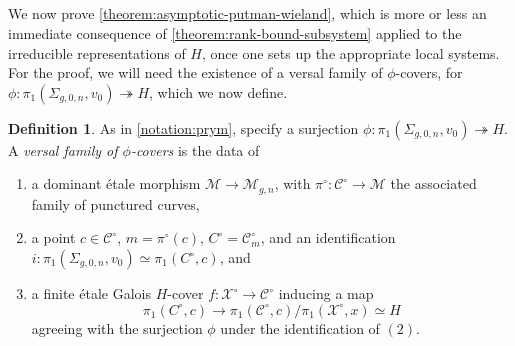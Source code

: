 \documentclass[12 pt]{amsart}
\theoremstyle{plain}
\theoremstyle{definition}
\newtheorem{definition}[subsubsection]{Definition}
\theoremstyle{remark}
\numberwithin{equation}{section}
\begin{document}
\subsection{}
	\label{subsection:proof-putman-wieland}

We now prove 
\autoref{theorem:asymptotic-putman-wieland}, which
is more or less an immediate consequence of \autoref{theorem:rank-bound-subsystem}
applied to the irreducible representations of $H$,
once one sets up the appropriate local systems.
For the proof, we will need the existence of a versal family of $\phi$-covers,
for $\phi: \pi_1(\Sigma_{g, 0, n}, v_0)\twoheadrightarrow H$,
which we now define.
\begin{definition}
	\label{definition:}
	As in \autoref{notation:prym}, specify a surjection
	$\phi: \pi_1(\Sigma_{g, 0, n}, v_0)\twoheadrightarrow H$.
	A {\em versal family of $\phi$-covers} is the data of 
	\begin{enumerate}
\item a dominant \'etale morphism $\mathscr{M}\to \mathscr{M}_{g,n}$, with $\pi^\circ: \mathscr{C}^\circ\to \mathscr{M}$ the associated family of punctured curves,
\item a point $c\in \mathscr{C}^\circ$, $m=\pi^\circ(c)$, $C^\circ = \mathscr
C^\circ_m$, and an identification $i: \pi_1(\Sigma_{g, 0, n}, v_0)\simeq
\pi_1(C^\circ, c)$, and
\item a finite \'etale Galois $H$-cover $f: \mathscr{X}^\circ\to
	\mathscr{C}^\circ$ inducing a map
	$$\pi_1(C^\circ, c) \to \pi_1(\mathscr{C}^\circ,
	c)/\pi_1(\mathscr{X}^\circ,x) \simeq H$$
	agreeing with the surjection $\phi$ under the
	identification of $(2)$.
\end{enumerate}
\end{definition}
\end{document}
